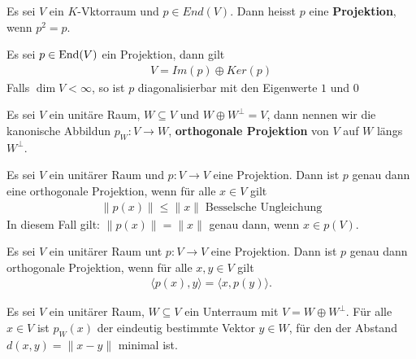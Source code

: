 \documentclass[../Algebra_script.tex]{subfiles}
\begin{document}
    \begin{definition}[Projection]
        Es sei $V$ ein $K$-Vktorraum und $p \in End(V)$. Dann heisst $p$ eine \textbf{Projektion}, wenn $p^2 = p$.
    \end{definition}

    \begin{proposition}
        Es sei $p \in \operatorname{End}(V)$ ein Projektion, dann gilt
        \begin{align*}
            V = Im(p) \oplus  Ker(p)
        \end{align*}
        Falls $\dim V < \infty$, so ist $p$ diagonalisierbar mit den Eigenwerte $1$ und $0$
    \end{proposition}

    \begin{definition}
        Es sei $V$ ein unitäre Raum, $W \subseteq V$ und $W \oplus W^{\perp} = V$, dann nennen wir die kanonische Abbildun $p_{W}:V \to W$, \textbf{orthogonale
        Projektion} von $V$ auf $W$ längs $W^{\perp}$.
    \end{definition}

    \begin{proposition}
        Es sei $V$ ein unitärer Raum und $p: V \to V$ eine Projektion. Dann ist $p$ genau dann eine orthogonale Projektion, wenn für alle $x \in V$ gilt
        \begin{align*}
            \|p(x)\| \le \|x\| \; \text{Besselsche Ungleichung}
        \end{align*}
        In diesem Fall gilt: $\|p(x)\| = \|x\|$ genau dann, wenn $x \in p(V)$.
    \end{proposition}

    \begin{proposition}
        Es sei $V$ ein unitärer Raum unt $p: V \to V$ eine Projektion. Dann ist $p$ genau dann orthogonale Projektion, wenn für alle $x,y \in V$ gilt
        \begin{align*}
            \langle p(x), y \rangle = \langle x, p(y) \rangle
        .\end{align*}
    \end{proposition}
    
    \begin{satz}
        Es sei $V$ ein unitärer Raum, $W \subseteq V$ ein Unterraum mit $V = W \oplus W^{\perp}$. Für alle $x \in V$ ist $p_{W}(x)$ der eindeutig bestimmte
        Vektor $y \in W$, für den der Abstand $d(x, y) = \|x - y\|$ minimal ist.
    \end{satz}
\end{document}
